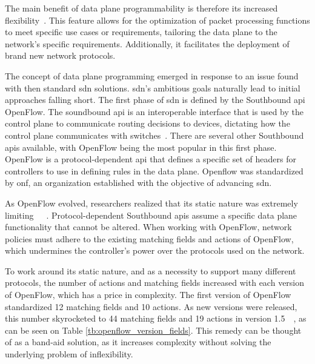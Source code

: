 The main benefit of data plane programmability is therefore its increased flexibility~\cite{bifulco_survey_2018}. This feature allows for the optimization of packet processing functions to meet specific use cases or requirements, tailoring the data plane to the network's specific requirements. Additionally, it facilitates the deployment of brand new network protocols. 

The concept of data plane programming emerged in response to an issue found with then standard \gls{sdn} solutions. \gls{sdn}'s ambitious goals naturally lead to initial approaches falling short. The first phase of \gls{sdn} is defined by the Southbound \gls{api} OpenFlow. The soundbound \gls{api} is an interoperable interface that is used by the control plane to communicate routing decisions to devices, dictating how the control plane communicates with switches~\cite{li_protocol_2017}. There are several other Southbound \glspl{api} available, with OpenFlow being the most popular in this first phase. OpenFlow is a protocol-dependent \gls{api} that defines a specific set of headers for controllers to use in defining rules in the data plane. Openflow was standardized by \gls{onf}, an organization established with the objective of advancing \gls{sdn}.

As OpenFlow evolved, researchers realized that its static nature was extremely limiting~\cite{bosshart_p4_2014}~\cite{hauser_survey_2021}~\cite{li_protocol_2017}. Protocol-dependent Southbound \glspl{api} assume a specific data plane functionality that cannot be altered. When working with OpenFlow, network policies must adhere to the existing matching fields and actions of OpenFlow, which undermines the controller's power over the protocols used on the network.  

To work around its static nature, and as a necessity to support many different protocols, the number of actions and matching fields increased with each version of OpenFlow, which has a price in complexity. The first version of OpenFlow standardized 12 matching fields and 10 actions. As new versions were released, this number skyrocketed to 44 matching fields and 19 actions in version 1.5~\cite{li_protocol_2017}~\cite{bosshart_p4_2014}, as can be seen on Table \ref{tb:openflow_version_fields}. This remedy can be thought of as a band-aid solution, as it increases complexity without solving the underlying problem of inflexibility.


